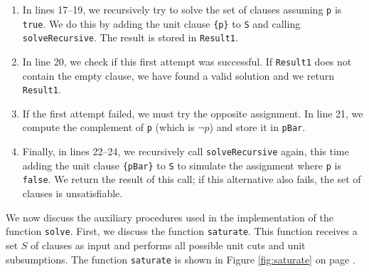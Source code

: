 \begin{enumerate}
  of \texttt{UsedVars}. 
\item In lines 17--19, we recursively try to solve the set of clauses assuming \texttt{p} is \texttt{true}. We
  do this by adding the unit clause \texttt{\{p\}} to \texttt{S} and calling \texttt{solveRecursive}. The
  result is stored in \texttt{Result1}. 
\item In line 20, we check if this first attempt was successful. If \texttt{Result1} does not contain the empty
  clause, we have found a valid solution and we return \texttt{Result1}. 
\item If the first attempt failed, we must try the opposite assignment. In line 21, we compute the complement
  of \texttt{p} (which is $\neg p$) and store it in \texttt{pBar}. 
\item Finally, in lines 22--24, we recursively call \texttt{solveRecursive} again, this time adding the unit
  clause \texttt{\{pBar\}} to \texttt{S} to simulate the assignment where \texttt{p} is \texttt{false}. We
  return the result of this call; if this alternative also fails, the set of clauses is unsatisfiable. 
\end{enumerate}

We now discuss the auxiliary procedures used in the implementation of the function
\texttt{solve}.
First, we discuss the function \texttt{saturate}. This function receives a
set $S$ of clauses as input and performs all possible unit cuts and
unit subsumptions.
The function \texttt{saturate} is shown in Figure \ref{fig:saturate} on page \pageref{fig:saturate}.

